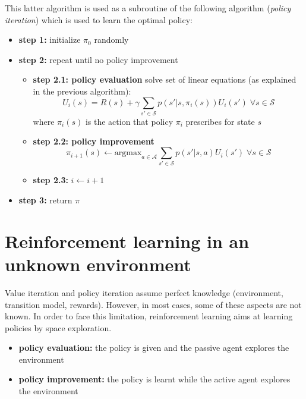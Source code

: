 This latter algorithm is used as a subroutine of the following algorithm (\textit{policy
iteration}) which is used to learn the optimal policy:
\begin{itemize}
	\item \textbf{step 1:} initialize $\pi_{0}$ randomly

	\item \textbf{step 2:} repeat until no policy improvement
		\begin{itemize}
			\item \textbf{step 2.1: policy evaluation} solve set of linear equations (as
				explained in the previous algorithm):
				\[
					U_{i}(s) = R(s) + \gamma \sum_{s' \in \mathcal{S}}p(s' | s, \pi_{i}(s))
					U_{i}(s') \; \forall s \in \mathcal{S}
				\]
				where $\pi_{i}(s)$ is the action that policy $\pi_{i}$ prescribes for state
				$s$

			\item \textbf{step 2.2: policy improvement}
				\[
					\pi_{i+1}(s) \leftarrow \text{argmax}_{a \in \mathcal{A}}\sum_{s' \in \mathcal{S}}
					p(s'|s,a)U_{i}(s') \; \forall s \in \mathcal{S}
				\]

			\item \textbf{step 2.3:} $i \leftarrow i+1$
		\end{itemize}

	\item \textbf{step 3:} return $\pi$
\end{itemize}

\section{Reinforcement learning in an unknown environment}

Value iteration and policy iteration assume perfect knowledge (environment, transition
model, rewards). However, in most cases, some of these aspects are not known. In
order to face this limitation, reinforcement learning aims at learning policies
by space exploration.
\begin{itemize}
	\item \textbf{policy evaluation:} the policy is given and the passive agent
		explores the environment

	\item \textbf{policy improvement:} the policy is learnt while the active agent
		explores the environment
\end{itemize}

